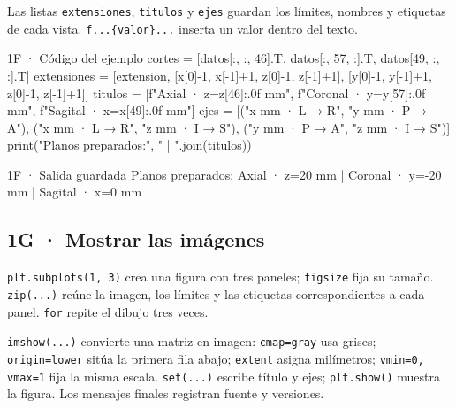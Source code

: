 Las listas \texttt{\small extensiones}, \texttt{\small titulos} y \texttt{\small ejes} guardan los límites, nombres y etiquetas de cada vista. \texttt{\small f\textquotedbl{}.\allowbreak{}.\allowbreak{}.\allowbreak{}\{valor\}.\allowbreak{}.\allowbreak{}.\allowbreak{}\textquotedbl{}} inserta un valor dentro del texto.

\begin{CodigoVivo}{1F · Código del ejemplo}
cortes = [datos[:, :, 46].T, datos[:, 57, :].T, datos[49, :, :].T]
extensiones = [extension, [x[0]-1, x[-1]+1, z[0]-1, z[-1]+1], [y[0]-1, y[-1]+1, z[0]-1, z[-1]+1]]
titulos = [f"Axial · z={z[46]:.0f} mm", f"Coronal · y={y[57]:.0f} mm", f"Sagital · x={x[49]:.0f} mm"]
ejes = [("x mm · L → R", "y mm · P → A"), ("x mm · L → R", "z mm · I → S"), ("y mm · P → A", "z mm · I → S")]
print("Planos preparados:", " | ".join(titulos))
\end{CodigoVivo}


\begin{Salida}{1F · Salida guardada}
Planos preparados: Axial · z=20 mm | Coronal · y=-20 mm | Sagital · x=0 mm
\end{Salida}



\subsection*{1G · Mostrar las imágenes}

\label{vivo:1g}

\texttt{\small plt.\allowbreak{}subplots(\allowbreak{}1,\allowbreak{} 3)\allowbreak{}} crea una figura con tres paneles; \texttt{\small figsize} fija su tamaño. \texttt{\small zip(\allowbreak{}.\allowbreak{}.\allowbreak{}.\allowbreak{})\allowbreak{}} reúne la imagen, los límites y las etiquetas correspondientes a cada panel. \texttt{\small for} repite el dibujo tres veces.

\texttt{\small imshow(\allowbreak{}.\allowbreak{}.\allowbreak{}.\allowbreak{})\allowbreak{}} convierte una matriz en imagen: \texttt{\small cmap=\textquotedbl{}gray\textquotedbl{}} usa grises; \texttt{\small origin=\textquotedbl{}lower\textquotedbl{}} sitúa la primera fila abajo; \texttt{\small extent} asigna milímetros; \texttt{\small vmin=0,\allowbreak{} vmax=1} fija la misma escala. \texttt{\small set(\allowbreak{}.\allowbreak{}.\allowbreak{}.\allowbreak{})\allowbreak{}} escribe título y ejes; \texttt{\small plt.\allowbreak{}show(\allowbreak{})\allowbreak{}} muestra la figura. Los mensajes finales registran fuente y versiones.

